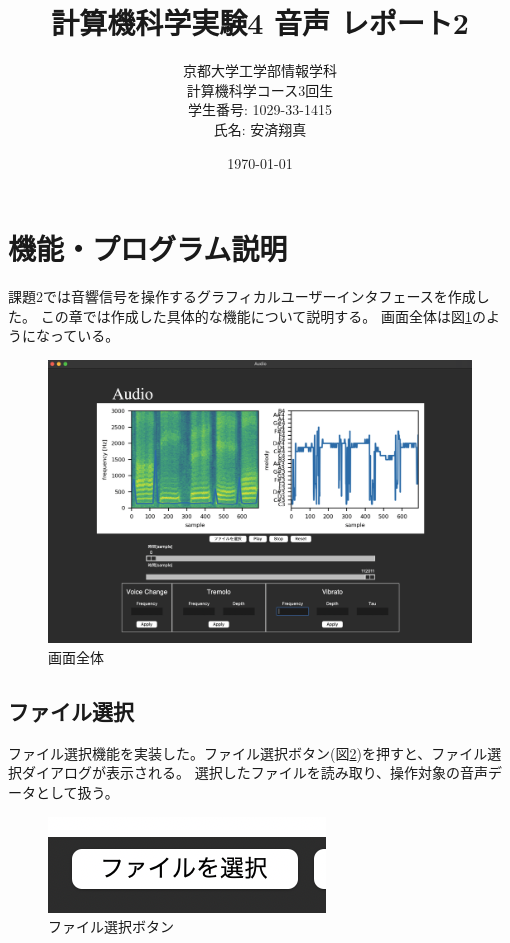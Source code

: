 \documentclass[a4paper,11pt]{jsarticle}
\begin{document}
\title{計算機科学実験4 音声 レポート2}
\author{
  京都大学工学部情報学科\\
  計算機科学コース3回生\\
  学生番号: 1029-33-1415\\
  氏名: 安済翔真\\
}
\date{\today}
\maketitle

\tableofcontents
\newpage


\section{機能・プログラム説明}

課題2では音響信号を操作するグラフィカルユーザーインタフェースを作成した。
この章では作成した具体的な機能について説明する。
画面全体は図\ref{fig:work2_app}のようになっている。

\begin{figure}[h]
\centering
\includegraphics[keepaspectratio, width=13cm]
{./images/work2_app.png}
\caption{画面全体}
\label{fig:work2_app}
\end{figure}

\subsection{ファイル選択}
ファイル選択機能を実装した。ファイル選択ボタン(図\ref{fig:select_file})を押すと、ファイル選択ダイアログが表示される。
選択したファイルを読み取り、操作対象の音声データとして扱う。

\begin{figure}[h]
\centering
\includegraphics[keepaspectratio, scale = 1.0]
{./images/select_file.png}
\caption{ファイル選択ボタン}
\label{fig:select_file}
\end{figure}
\end{document}
